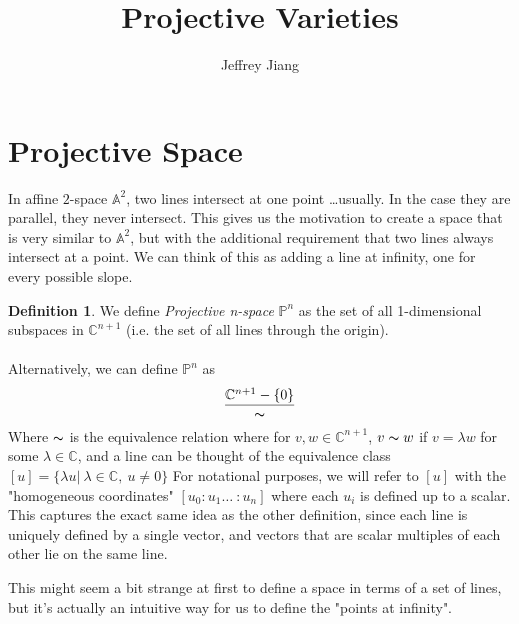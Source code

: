 \documentclass[psamsfonts]{amsart}
\theoremstyle{definition}
\newtheorem{defn}[thm]{Definition}
\theoremstyle{remark}
\newcommand{\C}{\mathbb{C}}
\newcommand{\A}{\mathbb{A}}
\newcommand{\p}{\mathbb{P}}
\begin{document}
\author{Jeffrey Jiang}
\title{Projective Varieties}
\maketitle

\large
\section{Projective Space}
In affine $2$-space $\A^2$, two lines intersect at one point \dots usually. In the case they are parallel, they never intersect. This gives us the motivation to create a space that is very similar to $\A^2$, but with the additional requirement that two lines always intersect at a point. We can think of this as adding a line at infinity, one for every possible slope.

\begin{defn}
We define \textit{Projective n-space} $\p^n$ as the set of all 1-dimensional subspaces in $\C^{n+1}$ (i.e. the set of all lines through the origin).\\\\
Alternatively, we can define $\p^n$ as
\begin{equation*}
\frac{\C^{n+1} - \{0\}}{\thicksim}
\end{equation*}
$ $\\
Where $\thicksim$ is the equivalence relation where for $v,w \in \C^{n+1}$, $v \thicksim w$ if $v = \lambda w$ for some $\lambda \in \C$, and a line can be thought of the equivalence class $[u] = \{\lambda u | ~ \lambda \in \C, ~u \neq 0\}$ For notational purposes, we will refer to $[u]$ with the "homogeneous coordinates" $[u_0: u_1 \dots~ :u_n]$ where each $u_i$ is defined up to a scalar. This captures the exact same idea as the other definition, since each line is uniquely defined by a single vector, and vectors that are scalar multiples of each other lie on the same line.
\end{defn}

This might seem a bit strange at first to define a space in terms of a set of lines, but it's actually an intuitive way for us to define the "points at infinity".
\end{document}
